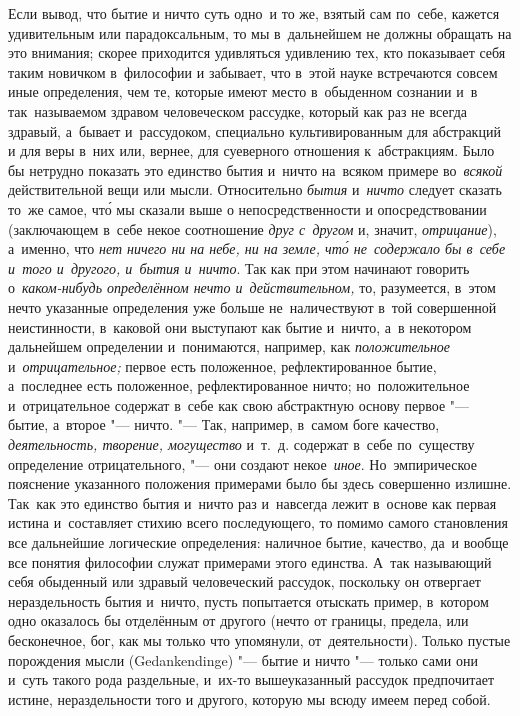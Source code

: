 Если вывод, что бытие и ничто суть одно~и то же, взятый сам по~себе, кажется
удивительным или парадоксальным, то мы в~дальнейшем не должны обращать на это
внимания; скорее приходится удивляться удивлению тех, кто показывает себя таким
новичком в~философии и забывает, что в~этой науке встречаются совсем иные
определения, чем те, которые имеют место в~обыденном сознании и~в
так~называемом здравом человеческом рассудке, который как раз не всегда
здравый, а~бывает и~рассудоком, специально культивированным для абстракций и
для веры в~них или, вернее, для суеверного отношения к~абстракциям. Было бы
нетрудно показать это единство бытия и~ничто на~всяком примере во~{\em всякой}
действительной вещи или мысли. Относительно {\em бытия} и~{\em ничто} следует
сказать то~же самое, чт\'{о} мы сказали выше о непосредственности и
опосредствовании (заключающем в~себе некое соотношение {\em друг с~другом} и,
значит, {\em отрицание}), а~именно, что {\em нет ничего ни на небе, ни на
земле, чт\'{о} не~содержало бы в~себе и~того и~другого, и~бытия и~ничто}. Так
как при этом начинают говорить о~{\em каком-нибудь определённом нечто
и~действительном,} то, разумеется, в~этом нечто указанные определения уже
больше не~наличествуют в~той совершенной неистинности, в~каковой они выступают
как бытие и~ничто, а~в некотором дальнейшем определении и~понимаются, например,
как {\em положительное} и~{\em отрицательное;} первое есть положенное,
рефлектированное бытие, а~последнее есть положенное, рефлектированное ничто;
но~положительное и~отрицательное содержат в~себе как свою абстрактную основу
первое "--- бытие, а~второе "--- ничто. "--- Так, например, в~самом боге
качество, {\em деятельность, творение, могущество} и~т.~д. содержат в~себе
по~существу определение отрицательного, "--- они создают некое~{\em иное}.
Но~эмпирическое пояснение указанного положения примерами было бы здесь
совершенно излишне. Так~как это единство бытия и~ничто раз и~навсегда лежит
в~основе как первая истина и~составляет стихию всего последующего, то помимо
самого становления все дальнейшие логические определения: наличное бытие,
качество, да~и вообще все понятия философии служат примерами этого единства.
А~так называющий себя обыденный или здравый человеческий рассудок, поскольку он
отвергает нераздельность бытия и~ничто, пусть попытается отыскать пример,
в~котором одно оказалось бы отделённым от другого (нечто от границы, предела,
или бесконечное, бог, как мы только что упомянули, от~деятельности). Только
пустые порождения мысли (Gedank\-end\-inge) "--- бытие и ничто "--- только сами
они и~суть такого рода раздельные, и~их-то вышеуказанный рассудок предпочитает
истине, нераздельности того и другого, которую мы всюду имеем перед собой.

